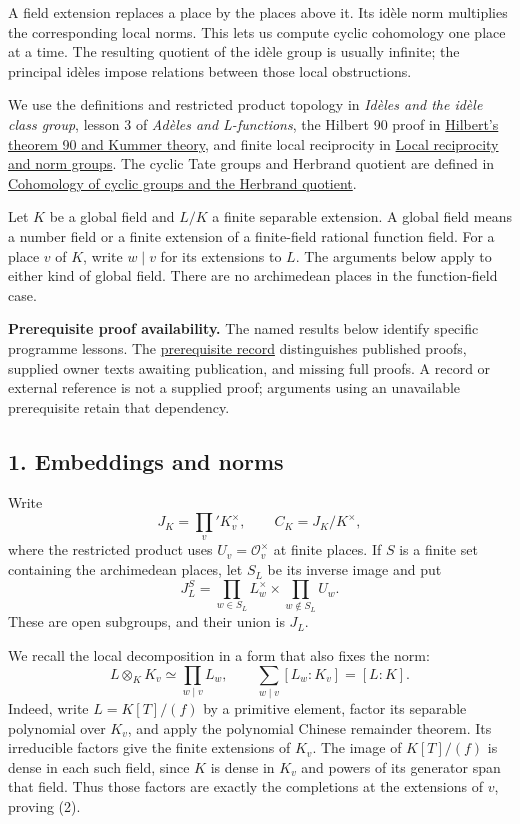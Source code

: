 \documentclass[11pt,a4paper]{article}
\begin{document}
A field extension replaces a place by the places above it. Its idèle
norm multiplies the corresponding local norms. This lets us compute
cyclic cohomology one place at a time. The resulting quotient of the
idèle group is usually infinite; the principal idèles impose relations
between those local obstructions.

We use the definitions and restricted product topology in \emph{Idèles
and the idèle class group}, lesson 3 of \emph{Adèles and L-functions},
the Hilbert 90 proof in
\href{../hilberts-theorem-90-and-kummer-theory.html}{Hilbert's theorem
90 and Kummer theory}, and finite local reciprocity in
\href{../local-reciprocity-and-norm-groups.html}{Local reciprocity and
norm groups}. The cyclic Tate groups and Herbrand quotient are defined
in
\href{../cohomology-of-cyclic-groups-and-the-herbrand-quotient.html}{Cohomology
of cyclic groups and the Herbrand quotient}.

Let \(K\) be a global field and \(L/K\) a finite separable extension. A
global field means a number field or a finite extension of a
finite-field rational function field. For a place \(v\) of \(K\), write
\(w\mid v\) for its extensions to \(L\). The arguments below apply to
either kind of global field. There are no archimedean places in the
function-field case.

\textbf{Prerequisite proof availability.} The named results below
identify specific programme lessons. The
\href{https://kokunoyumeto.github.io/open-math-courses/courses/NT-CFT/proof-dependencies.html\#lesson-13}{prerequisite
record} distinguishes published proofs, supplied owner texts awaiting
publication, and missing full proofs. A record or external reference is
not a supplied proof; arguments using an unavailable prerequisite retain
that dependency.

\subsection{1. Embeddings and norms}\label{embeddings-and-norms}

Write \[
J_K=\prod_v'K_v^\times,\qquad C_K=J_K/K^\times,
\] where the restricted product uses \(U_v=\mathcal O_v^\times\) at
finite places. If \(S\) is a finite set containing the archimedean
places, let \(S_L\) be its inverse image and put \[
J_L^S=\prod_{w\in S_L}L_w^\times\times
                \prod_{w\notin S_L}U_w.
\tag{1}
\] These are open subgroups, and their union is \(J_L\).

We recall the local decomposition in a form that also fixes the norm: \[
L\otimes_K K_v\simeq\prod_{w\mid v}L_w,\qquad
\sum_{w\mid v}[L_w:K_v]=[L:K].
\tag{2}
\] Indeed, write \(L=K[T]/(f)\) by a primitive element, factor its
separable polynomial over \(K_v\), and apply the polynomial Chinese
remainder theorem. Its irreducible factors give the finite extensions of
\(K_v\). The image of \(K[T]/(f)\) is dense in each such field, since
\(K\) is dense in \(K_v\) and powers of its generator span that field.
Thus those factors are exactly the completions at the extensions of
\(v\), proving (2).
\end{document}
